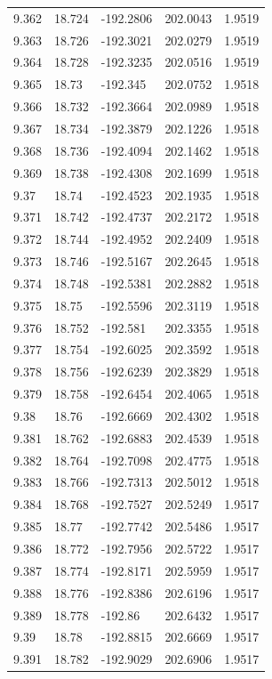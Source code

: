 \begin{tabular}{lllll}
9.362 & 18.724 & -192.2806 & 202.0043 & 1.9519 \\
9.363 & 18.726 & -192.3021 & 202.0279 & 1.9519 \\
9.364 & 18.728 & -192.3235 & 202.0516 & 1.9519 \\
9.365 & 18.73 & -192.345 & 202.0752 & 1.9518 \\
9.366 & 18.732 & -192.3664 & 202.0989 & 1.9518 \\
9.367 & 18.734 & -192.3879 & 202.1226 & 1.9518 \\
9.368 & 18.736 & -192.4094 & 202.1462 & 1.9518 \\
9.369 & 18.738 & -192.4308 & 202.1699 & 1.9518 \\
9.37 & 18.74 & -192.4523 & 202.1935 & 1.9518 \\
9.371 & 18.742 & -192.4737 & 202.2172 & 1.9518 \\
9.372 & 18.744 & -192.4952 & 202.2409 & 1.9518 \\
9.373 & 18.746 & -192.5167 & 202.2645 & 1.9518 \\
9.374 & 18.748 & -192.5381 & 202.2882 & 1.9518 \\
9.375 & 18.75 & -192.5596 & 202.3119 & 1.9518 \\
9.376 & 18.752 & -192.581 & 202.3355 & 1.9518 \\
9.377 & 18.754 & -192.6025 & 202.3592 & 1.9518 \\
9.378 & 18.756 & -192.6239 & 202.3829 & 1.9518 \\
9.379 & 18.758 & -192.6454 & 202.4065 & 1.9518 \\
9.38 & 18.76 & -192.6669 & 202.4302 & 1.9518 \\
9.381 & 18.762 & -192.6883 & 202.4539 & 1.9518 \\
9.382 & 18.764 & -192.7098 & 202.4775 & 1.9518 \\
9.383 & 18.766 & -192.7313 & 202.5012 & 1.9518 \\
9.384 & 18.768 & -192.7527 & 202.5249 & 1.9517 \\
9.385 & 18.77 & -192.7742 & 202.5486 & 1.9517 \\
9.386 & 18.772 & -192.7956 & 202.5722 & 1.9517 \\
9.387 & 18.774 & -192.8171 & 202.5959 & 1.9517 \\
9.388 & 18.776 & -192.8386 & 202.6196 & 1.9517 \\
9.389 & 18.778 & -192.86 & 202.6432 & 1.9517 \\
9.39 & 18.78 & -192.8815 & 202.6669 & 1.9517 \\
9.391 & 18.782 & -192.9029 & 202.6906 & 1.9517 \\

\end{tabular}
